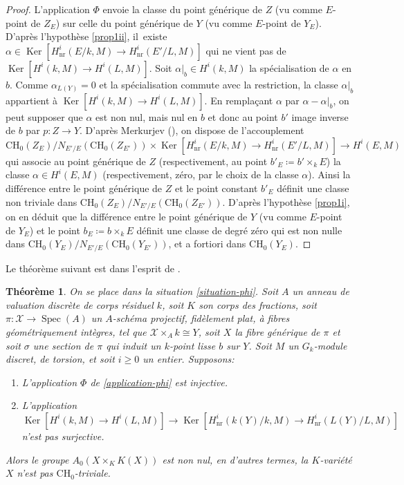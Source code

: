 \documentclass[JEP,XML,SOM,Unicode,francais,published]{cedram}
\newenvironment{enumeratei}
{\bgroup\def\theenumi{\roman{enumi}}\def\theenumii{\arabic{enumii}}\begin{enumerate}}
{\end{enumerate}\egroup}
\newcommand{\CH}{\mathrm{CH}}
\newtheorem{thm}{Théorème}[section]
\theoremstyle{definition}
\newcommand{\Spec}{\operatorname{Spec}}
\newcommand{\Ker}{\operatorname{Ker}}
\newcommand{\mc}[1]{\mathcal{#1}}
\newcommand{\on}[1]{\operatorname{#1}}
\begin{document}
\begin{proof}
L'application $\Phi$ envoie la classe du point générique de
$Z$ (vu comme $E$-point de $Z_E$) sur celle du point générique de $Y$ (vu comme $E$-point de $Y_E$). D'après l'hypothèse \eqref{prop1ii}, il~existe $\alpha \in \Ker [H^i_{\on{nr}}(E/k,M) \to H^i_{\on{nr}}(E'/L,M)]$ qui ne vient pas de $\Ker[H^i(k,M) \to H^i(L,M)]$. Soit $\alpha|_b\in H^i(k,M)$ la spécialisation de $\alpha$ en $b$. Comme $\alpha_{L(Y)}=0$ et la spécialisation commute avec la restriction, la classe $\alpha|_b$ appartient à $\Ker[H^i(k,M) \to H^i(L,M)]$. En remplaçant $\alpha$ par $\alpha-\alpha|_b$, on peut supposer que $\alpha$ est non nul, mais nul en $b$ et donc au point $b'$ image inverse de $b$ par $p\colon Z \to Y$. D'après Merkurjev \cite[Cor.\,2.9]{merkurjev2008unramified} (\cf \cite[Cor.\,5.2]{schreieder2021unramified}), on dispose
de l'accouplement
\[\CH_{0}(Z_{E})/ N_{E'/E}(\CH_{0}(Z_{E'})) \times \Ker [H^i_{\on{nr}}(E/k,M) \to H^i_{\on{nr}}(E'/L,M)] \to H^i(E,M)\]
qui associe au point générique de $Z$ (respectivement, au point $b'_{E}\coloneqq b'\times_k E$) la classe $\alpha \in H^{i}(E,M)$ (respectivement, zéro, par le choix de la classe $\alpha$). Ainsi la différence entre le point générique de $Z$ et le point constant $b'_E$
définit une classe non triviale dans $\CH_{0}(Z_{E})/ N_{E'/E}(\CH_{0}(Z_{E'}))$. D'après l'hypothèse \eqref{prop1i}, on en déduit que
la différence entre le point générique de $Y$ (vu comme $E$-point de $Y_E$) et le point $b_{E}\coloneqq b\times_{k}E$
définit une classe de degré zéro qui est non nulle dans $\CH_{0}(Y_{E})/ N_{E'/E}(\CH_{0}(Y_{E'}))$,
et a fortiori dans $\CH_{0}(Y_{E})$.
\end{proof}

Le théorème suivant est dans l'esprit de \cite[Th.\,1.14]{colliot2016hypersurfaces}.

\begin{thm}\label{1.14K}
On se place dans la situation \ref{situation-phi}. Soit $A$ un anneau de valuation discrète de corps résiduel $k$, soit $K$ son corps des fractions, soit $\pi \colon { \mathcal{X}} \to \Spec(A)$ un $A$\nobreakdash-schéma projectif, fidèlement plat, à fibres géométriquement intègres, tel que \hbox{$\mc{X}\times_Ak\cong Y$}, soit $X$ la fibre générique de $\pi$ et soit $\sigma$ une section de $\pi$ qui induit un $k$-point lisse $b$ sur $Y$. Soit $M$ un $G_k$-module discret, de torsion, et soit $i\geq 0$ un entier. Supposons:
\begin{enumeratei}
\item\label{1.14Ki}
L'application $\Phi$ de \eqref{application-phi} est injective.
\item\label{1.14Kii}
L'application \[\Ker[H^i(k,M) \to H^i(L,M)] \to \Ker [H^i_{\on{nr}}(k(Y)/k,M) \to H^i_{\on{nr}}(L(Y)/L,M)]\] n'est pas
surjective.
\end{enumeratei}
Alors le groupe $A_{0}(X\times_{K}K(X))$ est non nul, en d'autres termes,
la $K$-variété $X$ n'est pas $\CH_{0}$-triviale.
\end{thm}
\end{document}
